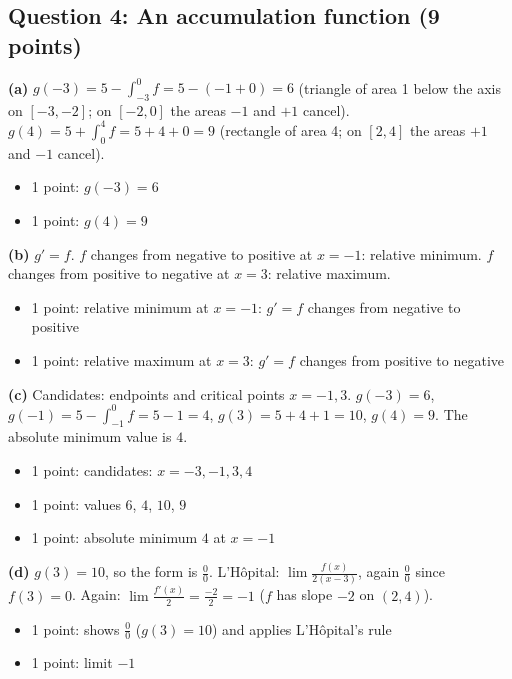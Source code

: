 \documentclass{apcalc}
\begin{document}
\subsection*{Question 4: An accumulation function (9 points)}
\textbf{(a)} $g(-3)=5-\int_{-3}^0f=5-(-1+0)=6$ (triangle of area 1 below the axis on $[-3,-2]$; on $[-2,0]$ the areas $-1$ and $+1$ cancel). $g(4)=5+\int_0^4f=5+4+0=9$ (rectangle of area 4; on $[2,4]$ the areas $+1$ and $-1$ cancel).
\begin{itemize}[leftmargin=1.6em,itemsep=0pt]
\item 1 point: $g(-3)=6$
\item 1 point: $g(4)=9$
\end{itemize}
\textbf{(b)} $g'=f$. $f$ changes from negative to positive at $x=-1$: relative minimum. $f$ changes from positive to negative at $x=3$: relative maximum.
\begin{itemize}[leftmargin=1.6em,itemsep=0pt]
\item 1 point: relative minimum at $x=-1$: $g'=f$ changes from negative to positive
\item 1 point: relative maximum at $x=3$: $g'=f$ changes from positive to negative
\end{itemize}
\textbf{(c)} Candidates: endpoints and critical points $x=-1,3$. $g(-3)=6$, $g(-1)=5-\int_{-1}^0f=5-1=4$, $g(3)=5+4+1=10$, $g(4)=9$. The absolute minimum value is $4$.
\begin{itemize}[leftmargin=1.6em,itemsep=0pt]
\item 1 point: candidates: $x=-3,-1,3,4$
\item 1 point: values $6$, $4$, $10$, $9$
\item 1 point: absolute minimum $4$ at $x=-1$
\end{itemize}
\textbf{(d)} $g(3)=10$, so the form is $\frac00$. L'Hôpital: $\lim\frac{f(x)}{2(x-3)}$, again $\frac00$ since $f(3)=0$. Again: $\lim\frac{f'(x)}{2}=\frac{-2}{2}=-1$ ($f$ has slope $-2$ on $(2,4)$).
\begin{itemize}[leftmargin=1.6em,itemsep=0pt]
\item 1 point: shows $\frac00$ ($g(3)=10$) and applies L'Hôpital's rule
\item 1 point: limit $-1$
\end{itemize}
\end{document}
